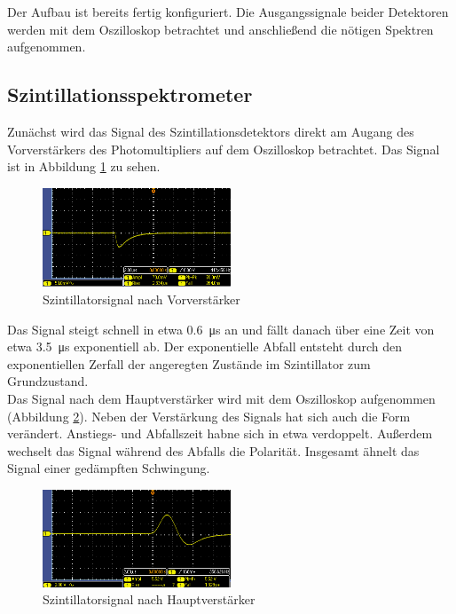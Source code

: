 Der Aufbau ist bereits fertig konfiguriert. Die Ausgangssignale beider Detektoren werden mit dem Oszilloskop betrachtet und anschließend die nötigen Spektren aufgenommen. 

\subsection{Szintillationsspektrometer}
Zunächst wird das Signal des Szintillationsdetektors direkt am Augang des Vorverstärkers des Photomultipliers auf dem Oszilloskop betrachtet. Das Signal ist in Abbildung \ref{fig:szint_nach_vorv} zu sehen.
\begin{figure}[h]
  \centering
  \includegraphics[width=0.5\textwidth]{data/raw/szint_nach_vorv.png}
  \caption{Szintillatorsignal nach Vorverstärker}
  \label{fig:szint_nach_vorv}
\end{figure}

Das Signal steigt schnell in etwa \SI{0.6}{\micro\second} an und fällt danach über eine Zeit von etwa \SI{3.5}{\micro\second} exponentiell ab. Der exponentielle Abfall entsteht durch den exponentiellen Zerfall der angeregten Zustände im Szintillator zum Grundzustand.\\

Das Signal nach dem Hauptverstärker wird mit dem Oszilloskop aufgenommen (Abbildung \ref{fig:szint_nach_haupt}). Neben der Verstärkung des Signals hat sich auch die Form verändert. Anstiegs- und Abfallszeit habne sich in etwa verdoppelt. Außerdem wechselt das Signal während des Abfalls die Polarität. Insgesamt ähnelt das Signal einer gedämpften Schwingung.\\ 
\begin{figure}[h]
  \centering
  \includegraphics[width=0.5\textwidth]{data/raw/szint_nach_haupt.png}
  \caption{Szintillatorsignal nach Hauptverstärker}
  \label{fig:szint_nach_haupt}
\end{figure}

